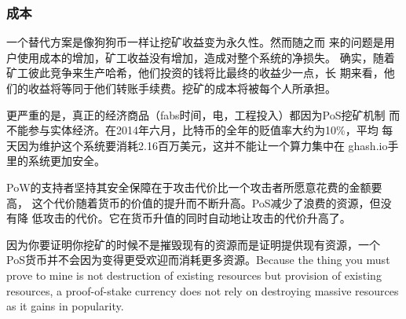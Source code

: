 \documentclass[letterpaper]{article}
\begin{document}
\subsubsection{成本}
一个替代方案是像狗狗币\cite{doge}一样让挖矿收益变为永久性。然而随之而
来的问题是用户使用成本的增加，矿工收益没有增加，造成对整个系统的净损失。
确实，随着矿工彼此竞争来生产哈希，他们投资的钱将比最终的收益少一点，长
期来看，他们的收益将等同于他们转账手续费。挖矿的成本将被每个人所承担。

更严重的是，真正的经济商品（fabs时间，电，工程投入）都因为PoS挖矿机制
而不能参与实体经济。在2014年六月，比特币的全年的贬值率大约为10\%，平均
每天因为维护这个系统要消耗2.16百万美元，这并不能让一个算力集中在
ghash.io手里的系统更加安全。

PoW的支持者坚持其安全保障在于攻击代价比一个攻击者所愿意花费的金额要高，
这个代价随着货币的价值的提升而不断升高。PoS减少了浪费的资源，但没有降
低攻击的代价。它在货币升值的同时自动地让攻击的代价升高了。

因为你要证明你挖矿的时候不是摧毁现有的资源而是证明提供现有资源，一个
PoS货币并不会因为变得更受欢迎而消耗更多资源。Because the thing you
must prove to mine is not destruction of existing resources but
provision of existing resources, a proof-of-stake currency does not
rely on destroying massive resources as it gains in popularity.
\end{document}
